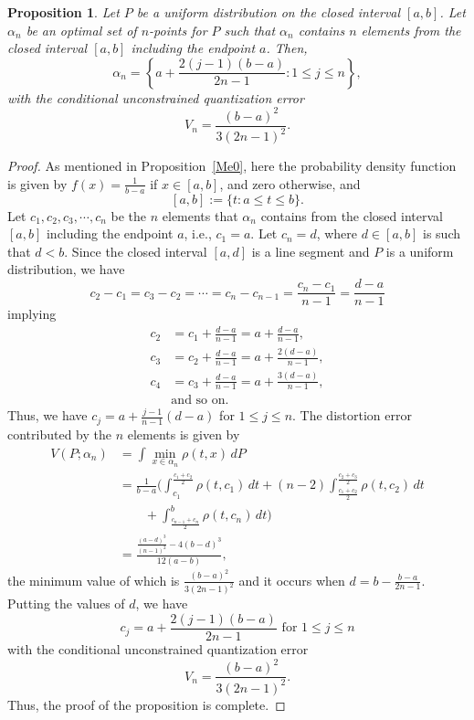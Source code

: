 \documentclass[12pt, reqno]{amsart}
\theoremstyle{plain}
\newtheorem{prop}[subsection]{Proposition}
\theoremstyle{definition}
\newcommand{\set}[1]{\{#1\}}%
\newcommand{\ga}{\alpha}
\newcommand{\te}{\text}%
\begin{document}
  
 \begin{prop} \label{Me030} 
Let $P$ be a uniform distribution on the closed interval $[a, b]$. Let $\ga_n$ be an optimal set of $n$-points for $P$ such that $\ga_n$ contains $n$ elements from the closed interval $[a, b]$ including the endpoint $a$. Then,
\[\ga_n=\left\{a+\frac{2(j-1)(b-a)}{2n-1} : 1\leq j\leq n\right\},\] 
with the conditional unconstrained quantization error 
 \[V_n=\frac{(b-a)^2}{3 (2 n-1)^2}.\]
\end{prop} 
 \begin{proof}
As mentioned in Proposition~\ref{Me0}, here the probability density function is given by $f(x)=\frac {1}{b-a}$ if $x\in [a, b]$, and zero otherwise, and 
\[[a, b]:=\set{t : a\leq t\leq b}.\]
Let ${c_1, c_2, c_3, \cdots, c_n}$ be the $n$ elements that $\ga_n$ contains from the closed interval $[a, b]$ including the endpoint $a$, i.e., $c_1=a$. Let $c_n=d$, where $d\in [a, b]$ is such that $d<b$. 
Since the closed interval $[a, d]$ is a line segment and $P$ is a uniform distribution, we have 
\[c_2-c_1=c_3-c_2=\cdots=c_{n}-c_{n-1}=\frac{c_n-c_1}{n-1}=\frac {d-a}{n-1}\]
implying 
\begin{align*}
c_2&=c_1+\frac {d-a}{n-1}=a+\frac {d-a}{n-1},\\
c_3&=c_2+\frac {d-a}{n-1}=a+\frac {2(d-a)}{n-1}, \\
c_4&=c_3+\frac {d-a}{n-1}=a+\frac {3(d-a)}{n-1},\\
&\te{and so on.}
\end{align*} 
Thus, we have $c_j= a+\frac{j-1}{n-1}(d-a)$ for $ 1\leq j\leq n$. The distortion error contributed by the $n$ elements is given by
 \begin{align*}
V(P; \ga_n)&=\int\min_{x\in \ga_n} \rho(t, x)\, dP\\
&=\frac 1{b-a} \Big( \int_{c_1}^{\frac  {c_1+c_2}2} \rho(t, c_1)\,dt+(n-2) \int_{\frac  {c_1+c_2}2}^{\frac  {c_2+c_3}2} \rho(t, c_2)\,dt \\
&\qquad +\int_{\frac  {c_{n-1}+c_n}2}^b \rho(t, c_n)\,dt\Big)\\
&=\frac{\frac{(a-d)^3}{(n-1)^2}-4 (b-d)^3}{12 (a-b)},
\end{align*} 
the minimum value of which is $\frac{(b-a)^2}{3 (2 n-1)^2}$ and it occurs when $d=b-\frac{b-a}{2 n-1}$. Putting the values of $d$, we have
\[c_j=a+\frac{2(j-1)(b-a)}{2n-1} \te{ for } 1\leq j\leq n\] 
with the conditional unconstrained quantization error 
 \[V_n=\frac{(b-a)^2}{3 (2 n-1)^2}.\]
Thus, the proof of the proposition is complete. 
  \end{proof}
  
\end{document}

